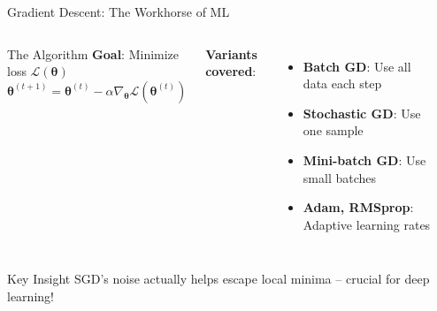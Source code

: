 \documentclass[aspectratio=169,11pt]{beamer}
\begin{document}
\begin{frame}{Gradient Descent: The Workhorse of ML}
\begin{columns}
\begin{block}{The Algorithm}
\textbf{Goal}: Minimize loss $\mathcal{L}(\bm{\theta})$
\[
\bm{\theta}^{(t+1)} = \bm{\theta}^{(t)} - \alpha \nabla_{\bm{\theta}} \mathcal{L}(\bm{\theta}^{(t)})
\]
\end{block}

\textbf{Variants covered}:
\begin{itemize}
    \item \textbf{Batch GD}: Use all data each step
    \item \textbf{Stochastic GD}: Use one sample
    \item \textbf{Mini-batch GD}: Use small batches
    \item \textbf{Adam, RMSprop}: Adaptive learning rates
\end{itemize}

\begin{center}
\end{center}
\end{columns}

\vspace{0.5em}
\begin{alertblock}{Key Insight}
SGD's noise actually helps escape local minima -- crucial for deep learning!
\end{alertblock}
\end{frame}
\end{document}
